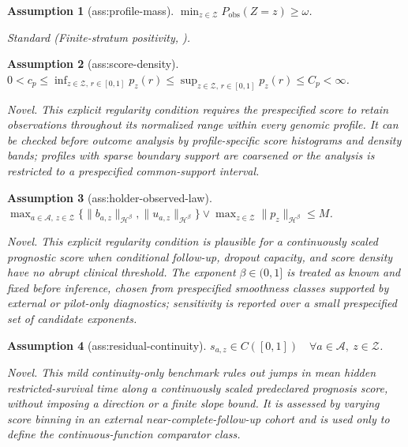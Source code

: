 \documentclass{article}
\newtheorem{assumption}{Assumption}
\begin{document}
\begin{assumption}[ass:profile-mass]\label{ass:profile-mass}
\(\min_{z\in\mathcal Z}P_{\mathrm{obs}}(Z=z)\ge\omega\).
\par\smallskip\noindent\emph{Standard} (Finite-stratum positivity, \cite{WeiPetersenvanderLaanEtAl2023}).
\end{assumption}

\begin{assumption}[ass:score-density]\label{ass:score-density}
\(0<c_p\le\inf_{z\in\mathcal Z,\,r\in[0,1]}p_z(r)\le\sup_{z\in\mathcal Z,\,r\in[0,1]}p_z(r)\le C_p<\infty\).
\par\smallskip\noindent\emph{Novel.} This explicit regularity condition requires the prespecified score to retain observations throughout its normalized range within every genomic profile. It can be checked before outcome analysis by profile-specific score histograms and density bands; profiles with sparse boundary support are coarsened or the analysis is restricted to a prespecified common-support interval.
\end{assumption}

\begin{assumption}[ass:holder-observed-law]\label{ass:holder-observed-law}
\(\max_{a\in\mathcal A,\,z\in\mathcal Z}\{\|b_{a,z}\|_{\mathcal H^\beta},\|u_{a,z}\|_{\mathcal H^\beta}\}\vee\max_{z\in\mathcal Z}\|p_z\|_{\mathcal H^\beta}\le M\).
\par\smallskip\noindent\emph{Novel.} This explicit regularity condition is plausible for a continuously scaled prognostic score when conditional follow-up, dropout capacity, and score density have no abrupt clinical threshold. The exponent \(\beta\in(0,1]\) is treated as known and fixed before inference, chosen from prespecified smoothness classes supported by external or pilot-only diagnostics; sensitivity is reported over a small prespecified set of candidate exponents.
\end{assumption}

\begin{assumption}[ass:residual-continuity]\label{ass:residual-continuity}
\(s_{a,z}\in C([0,1])\quad\forall a\in\mathcal A,\ z\in\mathcal Z\).
\par\smallskip\noindent\emph{Novel.} This mild continuity-only benchmark rules out jumps in mean hidden restricted-survival time along a continuously scaled predeclared prognosis score, without imposing a direction or a finite slope bound. It is assessed by varying score binning in an external near-complete-follow-up cohort and is used only to define the continuous-function comparator class.
\end{assumption}
\end{document}
